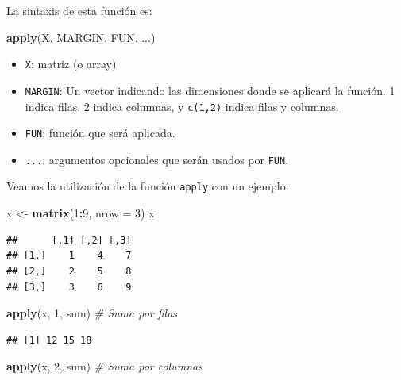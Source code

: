 \documentclass[]{book}
\newenvironment{Shaded}{\begin{snugshade}}{\end{snugshade}}
\newcommand{\CommentTok}[1]{\textcolor[rgb]{0.56,0.35,0.01}{\textit{#1}}}
\newcommand{\DataTypeTok}[1]{\textcolor[rgb]{0.13,0.29,0.53}{#1}}
\newcommand{\DecValTok}[1]{\textcolor[rgb]{0.00,0.00,0.81}{#1}}
\newcommand{\KeywordTok}[1]{\textcolor[rgb]{0.13,0.29,0.53}{\textbf{#1}}}
\newcommand{\NormalTok}[1]{#1}
\newcommand{\OperatorTok}[1]{\textcolor[rgb]{0.81,0.36,0.00}{\textbf{#1}}}
\newcommand{\StringTok}[1]{\textcolor[rgb]{0.31,0.60,0.02}{#1}}
\providecommand{\tightlist}{%
  \setlength{\itemsep}{0pt}\setlength{\parskip}{0pt}}
\begin{document}
La sintaxis de esta función es:

\begin{Shaded}
\begin{Highlighting}[]
\KeywordTok{apply}\NormalTok{(X, MARGIN, FUN, ...)}
\end{Highlighting}
\end{Shaded}

\begin{itemize}
\tightlist
\item
  \texttt{X}: matriz (o array)
\item
  \texttt{MARGIN}: Un vector indicando las dimensiones donde se aplicará
  la función. 1 indica filas, 2 indica columnas, y \texttt{c(1,2)} indica
  filas y columnas.
\item
  \texttt{FUN}: función que será aplicada.
\item
  \texttt{...}: argumentos opcionales que serán usados por \texttt{FUN}.
\end{itemize}

Veamos la utilización de la función \texttt{apply} con un ejemplo:

\begin{Shaded}
\begin{Highlighting}[]
\NormalTok{x <-}\StringTok{ }\KeywordTok{matrix}\NormalTok{(}\DecValTok{1}\OperatorTok{:}\DecValTok{9}\NormalTok{, }\DataTypeTok{nrow =} \DecValTok{3}\NormalTok{)}
\NormalTok{x}
\end{Highlighting}
\end{Shaded}

\begin{verbatim}
##      [,1] [,2] [,3]
## [1,]    1    4    7
## [2,]    2    5    8
## [3,]    3    6    9
\end{verbatim}

\begin{Shaded}
\begin{Highlighting}[]
\KeywordTok{apply}\NormalTok{(x, }\DecValTok{1}\NormalTok{, sum)    }\CommentTok{# Suma por filas}
\end{Highlighting}
\end{Shaded}

\begin{verbatim}
## [1] 12 15 18
\end{verbatim}

\begin{Shaded}
\begin{Highlighting}[]
\KeywordTok{apply}\NormalTok{(x, }\DecValTok{2}\NormalTok{, sum)    }\CommentTok{# Suma por columnas}
\end{Highlighting}
\end{Shaded}
\end{document}
